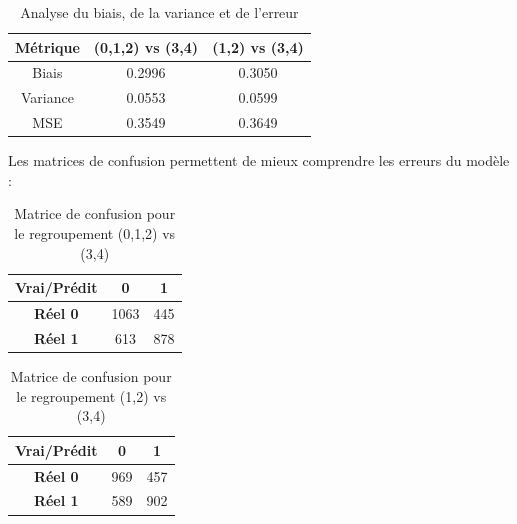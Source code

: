 \documentclass[a4paper,12pt]{article}
\begin{document}
\begin{table}[H]

\centering

\begin{tabular}{|c|c|c|}

\hline

\textbf{Métrique} & \textbf{(0,1,2) vs (3,4)} & \textbf{(1,2) vs (3,4)} \\ \hline

Biais & 0.2996 & 0.3050 \\ \hline

Variance & 0.0553 & 0.0599 \\ \hline

MSE & 0.3549 & 0.3649 \\ \hline

\end{tabular}

\caption{Analyse du biais, de la variance et de l'erreur}

\end{table}
 
\bigskip
 
Les matrices de confusion permettent de mieux comprendre les erreurs du modèle :
 
\begin{table}[H]

\centering

\begin{tabular}{|c|c|c|}

\hline

\textbf{Vrai/Prédit} & 0 & 1 \\ \hline

\textbf{Réel 0} & 1063 & 445 \\ \hline

\textbf{Réel 1} & 613 & 878 \\ \hline

\end{tabular}

\caption{Matrice de confusion pour le regroupement (0,1,2) vs (3,4)}

\end{table}
 
\bigskip
 
\begin{table}[H]

\centering

\begin{tabular}{|c|c|c|}

\hline

\textbf{Vrai/Prédit} & 0 & 1 \\ \hline

\textbf{Réel 0} & 969 & 457 \\ \hline

\textbf{Réel 1} & 589 & 902 \\ \hline

\end{tabular}

\caption{Matrice de confusion pour le regroupement (1,2) vs (3,4)}

\end{table}
 
\end{document}
